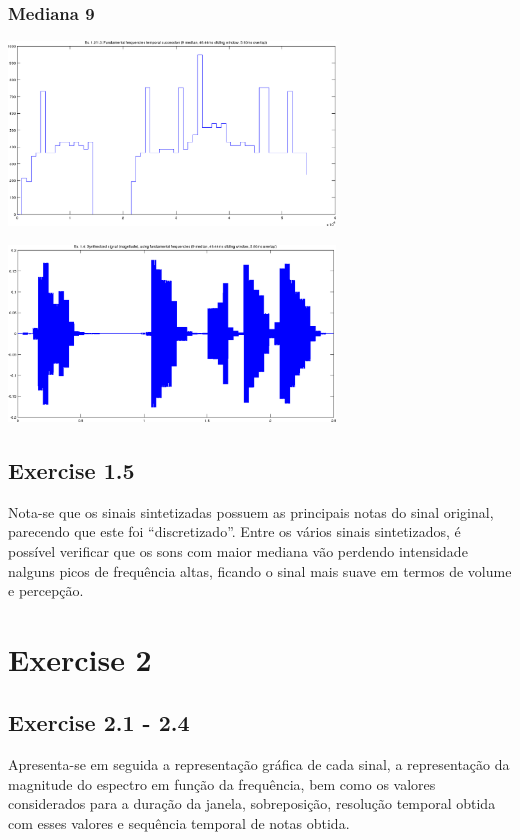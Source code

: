\documentclass[a4paper]{article}
\begin{document}
\subsubsection{Mediana 9}
\begin{center}
	\includegraphics[width=0.65\textwidth]{images/ex_1_3_succession_9.png}
\end{center}
\begin{center}
	\includegraphics[width=0.65\textwidth]{images/ex_1_4_synth_9.png}
\end{center}

\subsection{Exercise 1.5}
\indent \indent Nota-se que os sinais sintetizadas possuem as principais notas do sinal original, parecendo que este foi ``discretizado''. Entre os vários sinais sintetizados, é possível verificar que os sons com maior mediana vão perdendo intensidade nalguns picos de frequência altas, ficando o sinal mais suave em termos de volume e percepção.

\section{Exercise 2}
\subsection{Exercise 2.1 - 2.4}
\indent \indent Apresenta-se em seguida a representação gráfica de cada sinal, a representação da magnitude do espectro em função da frequência, bem como os valores considerados para a duração da janela, sobreposição, resolução temporal obtida com esses valores e sequência temporal de notas obtida.
\end{document}
